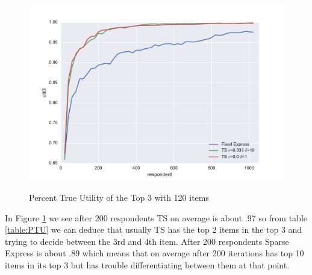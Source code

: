\documentclass[nonblindrev]{informs3}
\begin{document}
\begin{figure}
\caption{Percent True Utility of the Top 3 with 120 items}
\includegraphics[width=1\textwidth]{plots/3util120show3.pdf}
\label{fig:3util}
\end{figure}
In Figure \ref{fig:3util} we see after 200 respondents TS on average is about .97 so from table \ref{table:PTU} we can deduce that usually TS has the top 2 items in the top 3 and trying to decide between the 3rd and 4th item. After 200 respondents Sparse Express is about .89 which means that on average after 200 iterations has top 10 items in its top 3 but has trouble differentiating between them at that point.
\end{document}
